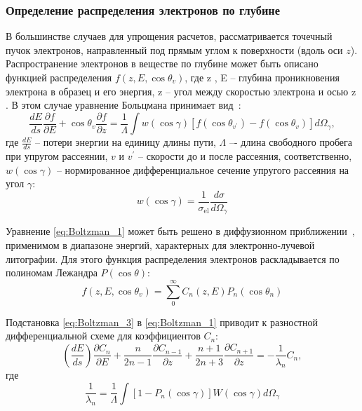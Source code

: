 \subsubsection{Определение распределения электронов по глубине}
В большинстве случаев для упрощения расчетов, рассматривается точечный пучок электронов, направленный под прямым углом к поверхности (вдоль оси $z$). Распространение электронов в веществе по глубине может быть описано функцией распределения $f(z, E, \cos \theta_v)$, где z , E – глубина проникновения электрона в образец и его энергия, z – угол между скоростью электрона и осью z . В этом случае уравнение Больцмана принимает вид~\cite{ME_rev_60}:
\begin{equation} \label{eq:Boltzman_1}
	\frac{d E}{d s} \frac{\partial f}{\partial E}+\cos \theta_v \frac{\partial f}{\partial z}=\frac{1}{\Lambda} \int w(\cos \gamma)\left[f\left(\cos \theta_{v^{\prime}}\right)-f\left(\cos \theta_v\right)\right] d \Omega_\gamma,
\end{equation}
где $\frac{dE}{ds}$ -- потери энергии на единицу длины пути, $\Lambda$ –- длина свободного пробега при упругом рассеянии, $v$ и $v^{\prime}$ -- скорости до и после рассеяния, соответственно, $w(\cos \gamma)$ -- нормированное дифференциальное сечение упругого рассеяния на угол $\gamma$:
\begin{equation} \label{eq:Boltzman_2}
	w(\cos \gamma)=\frac{1}{\sigma_{\mathrm{el}}} \frac{d \sigma}{d \Omega_\gamma}
\end{equation}

Уравнение \ref{eq:Boltzman_1} может быть решено в диффузионном приближении~\cite{ME_rev_61}, применимом в диапазоне энергий, характерных для электронно-лучевой литографии. Для этого функция распределения электронов раскладывается по полиномам Лежандра $P(\cos \theta)$:
\begin{equation} \label{eq:Boltzman_3}
	f\left(z, E, \cos \theta_v\right)=\sum_0^{\infty} C_n(z, E) P_n\left(\cos \theta_n\right)
\end{equation}

Подстановка \ref{eq:Boltzman_3} в \ref{eq:Boltzman_1} приводит к разностной дифференциальной схеме для коэффициентов $C_n$:
\begin{equation} \label{eq:Boltzman_4}
	\left(\frac{d E}{d s}\right) \frac{\partial C_n}{\partial E}+\frac{n}{2 n-1} \frac{\partial C_{n-1}}{\partial z}+\frac{n+1}{2 n+3} \frac{\partial C_{n+1}}{\partial z}=-\frac{1}{\lambda_n} C_n,
\end{equation}
где
\begin{equation} \label{eq:Boltzman_5}
	\frac{1}{\lambda_n}=\frac{1}{\Lambda} \int\left[1-P_n(\cos \gamma)\right] W(\cos \gamma) d \Omega_\gamma
\end{equation}

